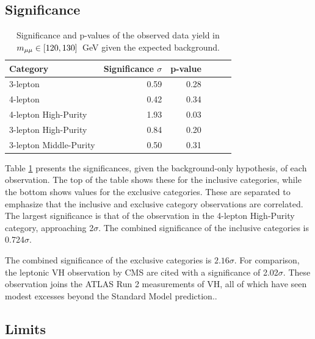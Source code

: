 \subsection{Significance}

\begin{table}[htp]
\caption{Significance and p-values of the observed data yield in $m_{\mu\mu}\in[120,130]$~GeV given the expected background.}
\begin{center}
\begin{tabular}{l r r r r r}\toprule
Category & Significance $\sigma$ & p-value \\
\midrule
3-lepton & 0.59 & 0.28 \\
4-lepton & 0.42 & 0.34 \\
\midrule
4-lepton High-Purity & 1.93 & 0.03 \\
3-lepton High-Purity & 0.84 & 0.20 \\
3-lepton Middle-Purity & 0.50 & 0.31 \\
\bottomrule\end{tabular} %
\label{tab:hmmSignificance}
\end{center}
\end{table}

Table \ref{tab:hmmSignificance} presents the significances, given the background-only hypothesis, of each observation.
The top of the table shows these for the inclusive categories, while the bottom shows values for the exclusive categories.
These are separated to emphasize that the inclusive and exclusive category observations are correlated.
The largest significance is that of the observation in the 4-lepton High-Purity category, approaching 2$\sigma$.
The combined significance of the inclusive categories is 0.724$\sigma$.

The combined significance of the exclusive categories is $2.16\sigma$.
For comparison, the leptonic VH observation by CMS are cited with a significance of 2.02$\sigma$. \cite{cmsHmm}
These observation joins the ATLAS Run 2 measurements of VH, all of which have seen modest excesses beyond the Standard Model prediction.. \cite{atlasHComb}

\subsection{Limits}

